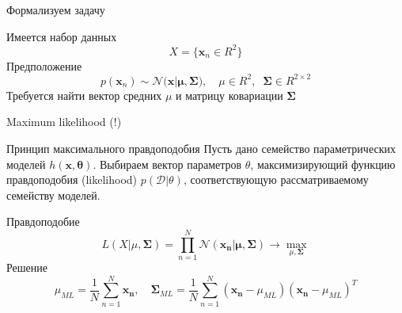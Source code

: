 \documentclass[aspectratio=169]{beamer}
\begin{document}
\begin{frame}{Формализуем задачу}

Имеется набор данных
\[
X = \{\mathbf{x}_n \in R^2\}
\]
Предположение
\[
p(\mathbf{x}_n) \sim \mathcal{N(\mathbf{x} | \mathbf{\mu}, \mathbf{\Sigma}}), \quad \mu \in R^2, \;\; \mathbf{\Sigma} \in R^{2 \times 2}
\]
Требуется найти вектор средних $\mu$ и матрицу ковариации $\mathbf{\Sigma}$

\end{frame}

\begin{frame}{Maximum likelihood (!)}

\begin{block}{Принцип максимального правдоподобия}
Пусть дано семейство параметрических моделей $h(\mathbf{x}, \mathbf{\theta})$. Выбираем вектор параметров $\theta$, максимизирующий функцию правдоподобия (likelihood) $p(\mathcal{D} | \theta)$, соответствующую рассматриваемому семейству моделей.
\end{block}

\vspace{1em}
Правдоподобие
\[
L(X | \mu, \mathbf{\Sigma}) = \prod_{n=1}^N \mathcal{N}(\mathbf{x_n} | \mathbf{\mu}, \mathbf{\Sigma}) \rightarrow \max_{\mu, \mathbf{\Sigma}}
\]
Решение
\[
\mu_{ML} = \frac 1 N \sum_{n=1}^N \mathbf{x_n}, \quad \mathbf{\Sigma}_{ML} = \frac 1 N \sum_{n=1}^N (\mathbf{x_n} - \mu_{ML}) (\mathbf{x_n} - \mu_{ML})^T
\]

\end{frame}
\end{document}
